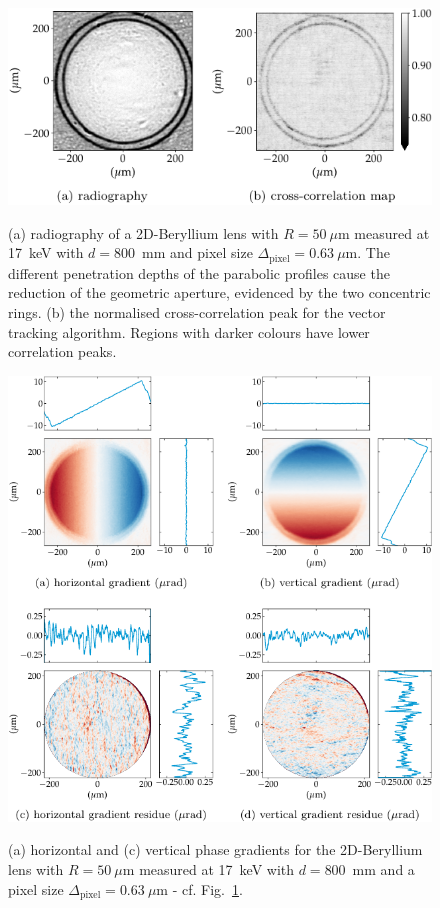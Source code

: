 \begin{refsection}
\begin{figure}[t]
        \centering
        {\includegraphics[width=.5\linewidth]{figures/ch04b/radio_corr_map.pdf}}
        \caption[Normalised cross-correlation map]{(a) radiography of a 2D-Beryllium lens with $R=50~\mu$m measured at 17~keV with $d=800$~mm and pixel size $\Delta_\text{pixel}= 0.63~\mu$m. The different penetration depths of the parabolic profiles cause the reduction of the geometric aperture, evidenced by the two concentric rings. (b) the normalised cross-correlation peak for the vector tracking algorithm. Regions with darker colours have lower correlation peaks.}\label{fig:cross-correlation-map}
\end{figure}

\begin{figure}[t]
        \centering
        {\includegraphics[width=.6\linewidth]{figures/ch04b/gradients.pdf}}
        \caption[Recovered phase gradient and residues]{(a) horizontal and (c) vertical phase gradients for the 2D-Beryllium lens with $R=50~\mu$m measured at 17~keV with $d=800$~mm and a pixel size $\Delta_\text{pixel}= 0.63~\mu$m - cf. Fig.~\ref{fig:cross-correlation-map}.}\label{fig:gradients}
\end{figure}


\end{refsection}
